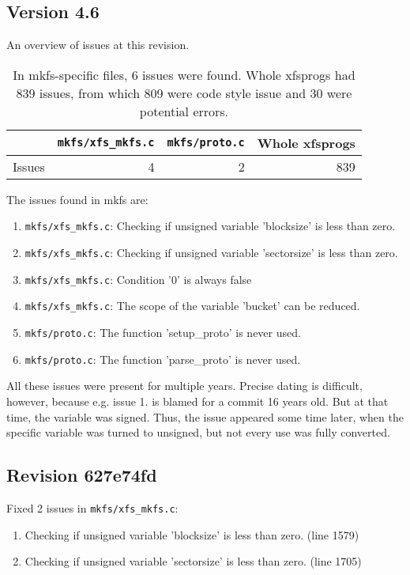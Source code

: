 \subsection{Version 4.6}

An overview of issues at this revision.
\begin{table}[h]
\begin{tabular}{|l||r|r||r|}
\hline
& {\tt mkfs/xfs\_mkfs.c} & {\tt mkfs/proto.c} & Whole xfsprogs \\
\hline
Issues & 4 & 2 & 839 \\
\hline
\end{tabular}
\caption{In mkfs-specific files, 6 issues were found. Whole
xfsprogs had 839 issues, from which 809 were code style issue and 30 were
potential errors.}
\end{table}

The issues found in mkfs are:
\begin{enumerate}
	\item {\tt mkfs/xfs\_mkfs.c}: Checking if unsigned variable 'blocksize' is less than zero.
	\item {\tt mkfs/xfs\_mkfs.c}: Checking if unsigned variable 'sectorsize' is less than zero.
	\item {\tt mkfs/xfs\_mkfs.c}: Condition '0' is always false
	\item {\tt mkfs/xfs\_mkfs.c}: The scope of the variable 'bucket' can be reduced.
	\item {\tt mkfs/proto.c}: The function 'setup\_proto' is never used.
	\item {\tt mkfs/proto.c}: The function 'parse\_proto' is never used.
\end{enumerate}

All these issues were present for multiple years. Precise dating is
difficult, however, because e.g. issue 1. is blamed for a commit 16 years
old. But at that time, the variable was signed. Thus, the issue appeared
some time later, when the specific variable was turned to unsigned, but not
every use was fully converted.



\subsection{Revision 627e74fd}
Fixed 2 issues in {\tt mkfs/xfs\_mkfs.c}:

\begin{enumerate}
\item Checking if unsigned variable 'blocksize' is less than zero. (line 1579)
\item Checking if unsigned variable 'sectorsize' is less than zero. (line
								     1705)
\end{enumerate}


